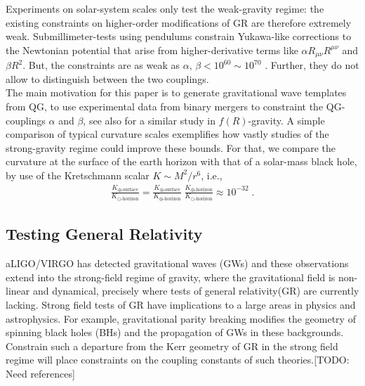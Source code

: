 \documentclass[a4paper,oneside,openany,11pt]{memoir}
\numberwithin{equation}{section} %
\newcommand{\TODO}[1]{{\color{red}[}{\color{red}TODO:} {\color{blue}#1}{\color{red}]}}
\begin{document}
Experiments on solar-system scales only test the weak-gravity regime: the existing constraints on higher-order modifications of GR are therefore extremely weak. Submillimeter-tests using pendulums constrain Yukawa-like corrections to the Newtonian potential that arise from higher-derivative terms like $\alpha  R_{\mu\nu}R^{\mu\nu}$ and $\beta  R^2$. But, the constraints are as weak as $\alpha,\,\beta < 10^{60}\sim 10^{70}$ \cite{Hoyle:2004cw, Kapner:2006si, Calmet:2017rxl}. Further, they do not allow to distinguish between the two couplings.
\\
The main motivation for this paper is to generate gravitational wave templates from QG, to use experimental data from binary mergers to constraint the QG-couplings $\alpha$ and $\beta$, see also \cite{Berry:2011pb, Cao:2013osa} for a similar study in $f(R)$-gravity. A simple comparison of typical curvature scales exemplifies how vastly studies of the strong-gravity regime could improve these bounds. For that, we compare the curvature at the surface of the earth horizon with that of a solar-mass black hole, by use of the Kretschmann scalar $K\sim M^2/r^6$, i.e.,
\begin{align}
	\frac{K_{\oplus\text{-surface}}}{K_{\odot\text{-horizon}}} = \frac{K_{\oplus\text{-surface}}}{K_{\oplus\text{-horizon}}}\;\frac{K_{\oplus\text{-horizon}}}{K_{\odot\text{-horizon}}} \approx 10^{-32}\;.
\end{align}

\subsection{Testing General Relativity}
aLIGO/VIRGO has detected gravitational waves (GWs) and these observations extend into the strong-field regime of gravity,
where the gravitational field is non-linear and dynamical, precisely where tests of general relativity(GR) are currently lacking. 
Strong field tests of GR have implications to a large areas in physics and astrophysics. For example, 
gravitational parity breaking modifies the geometry of spinning black holes (BHs) and the propagation of GWs in 
these backgrounds. Constrain such a departure from the Kerr geometry of GR in the strong field regime will place
constraints on the coupling constants of such theories.\TODO{Need references}
\end{document}
